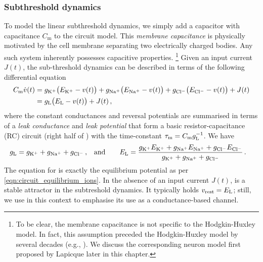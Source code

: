 \subsubsection{Subthreshold dynamics}
To model the linear subthreshold dynamics, we simply add a capacitor with capacitance $C_\mathrm{m}$ to the circuit model.
This \emph{membrane capacitance} is physically motivated by the cell membrane separating two electrically charged bodies.
Any such system inherently possesses capacitive properties.%
\footnote{To be clear, the membrane capacitance is not specific to the Hodgkin-Huxley model. In fact, this assumption preceded the Hodgkin-Huxley model by several decades (e.g., \cite{lapicque1907recherches}). We discuss the corresponding \LIF neuron model first proposed by Lapicque later in this chapter.}
Given an input current $J(t)$, the sub-threshold dynamics can be described in terms of the following differential equation
\begin{align}
	\begin{aligned}
	C_\mathrm{m} \dot{{v}}(t) &=
		  g_\mathrm{K^+} \bigl(E_\mathrm{K^+} - {v}(t)\bigr)
		+ g_\mathrm{Na^+} \bigl(E_\mathrm{Na^+} - {v}(t)\bigr)
		+ g_\mathrm{Cl^-} \bigl(E_\mathrm{Cl^-} - {v}(t)\bigr) + J(t) \\ &=
	g_\mathrm{L} \bigl(E_\mathrm{L} - {v}(t)\bigr) + J(t) \,,
	\end{aligned}
\end{align}
where the constant conductances and reversal potentials are summarised in terms of a \emph{leak conductance} \gL and \emph{leak potential} \EL that form a basic resistor-capacitance (RC) circuit (right half of ) with the time-constant ${\tau_\mathrm{m}} = C_\mathrm{m} g_\mathrm{L}^{-1}$.
We have
\begin{align*}
	g_\mathrm{L} &= g_\mathrm{K^+} + g_\mathrm{Na^+} + g_\mathrm{Cl^-} \,, &
	\text{and} \quad \quad E_\mathrm{L} &= \frac{g_\mathrm{K^+} E_\mathrm{K^+} +
				 	g_\mathrm{Na^+} E_\mathrm{Na^+} + g_\mathrm{Cl^-} E_\mathrm{Cl^-}}{g_\mathrm{K^+} + g_\mathrm{Na^+} + g_\mathrm{Cl^-}} \,.
\end{align*}
The equation for \EL is exactly the equilibrium potential as per \cref{eqn:circuit_equilibrium_ions}.
In the absence of an input current $J(t)$, \EL is a stable attractor in the subtreshold dynamics.
It typically holds $v_\mathrm{rest} = E_\mathrm{L}$; still, we use \EL in this context to emphasise its use as a conductance-based channel.

